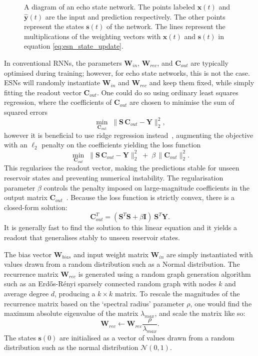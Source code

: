 \begin{figure}
    \caption{A diagram of an echo state network. The points labeled $\mathbf{x}(t)$ and $\mathbf{\hat{y}}(t)$ are the input and prediction respectively. The other points represent the states $\mathbf{s}(t)$ of the network. The lines represent the multiplications of the weighting vectors with $\mathbf{x}(t)$ and $\mathbf{s}(t)$ in equation \ref{eq:esn_state_update}.}
    \label{fig:ESN}
\end{figure}

In conventional RNNs, the parameters $\mathbf{W}_{in}$, $\mathbf{W}_{rec}$, and $\mathbf{C}_{out}$ are typically optimised during training; however, for echo state networks, this is not the case.
ESNs will randomly instantiate $\mathbf{W}_{in}$ and $\mathbf{W}_{rec}$ and keep them fixed, while simply fitting the readout vector $\mathbf{C}_{out}$. One could do so using ordinary least squares regression, where the coefficients of $\mathbf{C}_{out}$ are chosen to minimise the sum of squared errors
\[
\min_{\mathbf{C}_{out}} \;\bigl\lVert \mathbf{S}\,\mathbf{C}_{out} - \mathbf{Y}\bigr\rVert_2^2,
\]
however it is beneficial to use ridge regression instead~\cite{lukosevicius_2012_practical_guide}, augmenting the objective with an \(\ell_2\) penalty on the coefficients yielding the loss function
\[
\min_{\mathbf{C}_{out}}\;\bigl\lVert \mathbf{S}\,\mathbf{C}_{out} - \mathbf{Y}\bigr\rVert_2^2
\;+\;\beta\,\bigl\lVert \mathbf{C}_{out}\bigr\rVert_2^2.
\]
This regularises the readout vector, making the predictions stable for unseen reservoir states and preventing numerical instability. The regularisation parameter $\beta$ controls the penalty imposed on large-magnitude coefficients in the output matrix $\mathbf{C}_{out}$~\cite{lukosevicius_2012_practical_guide}. Because the loss function is strictly convex, there is a closed-form solution:
\[
    \mathbf{C}_{out}^T = (\mathbf{S}^T \mathbf{S} + \beta \mathbf{I}) \ \mathbf{S}^T \mathbf{Y}.
\]
It is generally fast to find the solution to this linear equation and it yields a readout that generalises stably to unseen reservoir states.

The bias vector $\mathbf{W}_{bias}$ and input weight matrix $\mathbf{W}_{in}$ are simply instantiated with values drawn from a random distribution such as a Normal distribution. The recurrence matrix $\mathbf{W}_{rec}$ is generated using a random graph generation algorithm such as an Erd\H{o}s-R\'enyi sparsely connected random graph with nodes $k$ and average degree $d$, producing a $k \times k$ matrix. To rescale the magnitudes of the recurrence matrix based on the `spectral radius' parameter $\rho$, one would find the maximum absolute eigenvalue of the matrix $\lambda_{max}$, and scale the matrix like so:
\[
\mathbf{W}_{rec} \leftarrow \mathbf{W}_{rec}\frac{\rho}{\lambda_{max}}.
\]
The states $\mathbf{s}(0)$ are initialised as a vector of values drawn from a random distribution such as the normal distribution $\mathcal{N}(0, 1)$.

